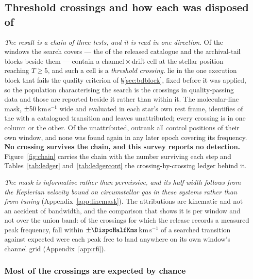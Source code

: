 \subsection{Threshold crossings and how each was disposed of}
\label{sec:technosearch}

\emph{The result is a chain of three tests, and it is read in one direction.}
Of the windows the search covers --- the \NWindows{} of the released
catalogue and the archival-tail blocks beside them --- \EvNCrossRaw{} contain a
channel\,$\times$\,drift cell at the stellar position reaching $T\geq5$, and
such a cell is a \emph{threshold crossing}. \EvNCrossFlag{} lie in the one
execution block that fails the quality criterion of \S\ref{sec:bdblock},
fixed before it was applied, so the population characterising the search is
the \EvNCrossQp{} crossings in quality-passing data and those
\EvNCrossFlag{} are reported beside it rather than within it. The
molecular-line mask,
$\pm50$\,km\,s$^{-1}$ wide and evaluated in each star's own rest
frame, identifies \EvNAttrQp{} of the \EvNCrossQp{} with a catalogued
transition and leaves \EvNUnattrQp{} unattributed; every crossing is in one
column or the other. Of the unattributed, \EvNRankQp{} outrank all
\NCtrl{} control positions of their own window, and none was found again in
any later epoch covering its frequency. \textbf{No crossing survives the chain,
and this survey reports no detection.}
Figure~\ref{fig:chain} carries the chain with the number surviving each
step and Tables~\ref{tab:ledger} and~\ref{tab:ledgercont} the
crossing-by-crossing ledger behind it.

\emph{The mask is informative rather than permissive, and its half-width
follows from the Keplerian velocity bound on circumstellar gas in these
systems rather than from tuning} (Appendix~\ref{app:linemask}). The
attributions are kinematic and not an accident of bandwidth, and the
comparison that shows it is per window and not over the union band: of the
\AppMNCrossF{} crossings for which the release records a measured peak
frequency, \AppMTubeObs{} fall within $\pm\DispoHalfKms$\,km\,s$^{-1}$ of a
searched transition against \AppMTubeNull{} expected were each peak free to
land anywhere on its own window's channel grid (Appendix~\ref{app:rfi}).

\subsubsection{Most of the crossings are expected by chance}
\label{sec:trigunif}

